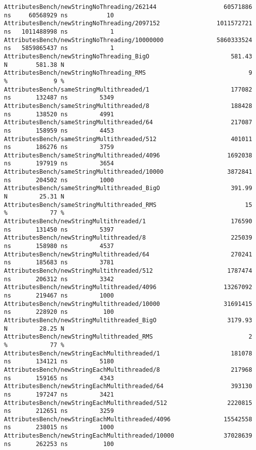 \begin{code}
\begin{verbatim}
AttributesBench/newStringNoThreading/262144                   60571886 ns     60568929 ns           10
AttributesBench/newStringNoThreading/2097152                1011572721 ns   1011488998 ns            1
AttributesBench/newStringNoThreading/10000000               5860333524 ns   5859865437 ns            1
AttributesBench/newStringNoThreading_BigO                       581.43 N        581.38 N
AttributesBench/newStringNoThreading_RMS                             9 %             9 %
AttributesBench/sameStringMultithreaded/1                       177082 ns       132487 ns         5349
AttributesBench/sameStringMultithreaded/8                       188428 ns       138520 ns         4991
AttributesBench/sameStringMultithreaded/64                      217087 ns       158959 ns         4453
AttributesBench/sameStringMultithreaded/512                     401011 ns       186276 ns         3759
AttributesBench/sameStringMultithreaded/4096                   1692038 ns       197919 ns         3654
AttributesBench/sameStringMultithreaded/10000                  3872841 ns       204502 ns         1000
AttributesBench/sameStringMultithreaded_BigO                    391.99 N         25.31 N
AttributesBench/sameStringMultithreaded_RMS                         15 %            77 %
AttributesBench/newStringMultithreaded/1                        176590 ns       131450 ns         5397
AttributesBench/newStringMultithreaded/8                        225039 ns       158980 ns         4537
AttributesBench/newStringMultithreaded/64                       270241 ns       185683 ns         3781
AttributesBench/newStringMultithreaded/512                     1787474 ns       206312 ns         3342
AttributesBench/newStringMultithreaded/4096                   13267092 ns       219467 ns         1000
AttributesBench/newStringMultithreaded/10000                  31691415 ns       228920 ns          100
AttributesBench/newStringMultithreaded_BigO                    3179.93 N         28.25 N
AttributesBench/newStringMultithreaded_RMS                           2 %            77 %
AttributesBench/newStringEachMultithreaded/1                    181078 ns       134121 ns         5180
AttributesBench/newStringEachMultithreaded/8                    217968 ns       159165 ns         4343
AttributesBench/newStringEachMultithreaded/64                   393130 ns       197247 ns         3421
AttributesBench/newStringEachMultithreaded/512                 2220815 ns       212651 ns         3259
AttributesBench/newStringEachMultithreaded/4096               15542558 ns       238015 ns         1000
AttributesBench/newStringEachMultithreaded/10000              37028639 ns       262253 ns          100

\end{verbatim}
\end{code}
